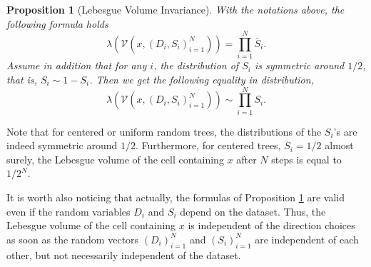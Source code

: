 \documentclass[paper=a4, fontsize=11pt]{scrartcl}
\newcommand{\ind}{\mathds{1}}
\newtheorem{proposition}[theorem]{Proposition}
\begin{document}
\begin{proposition}[Lebesgue Volume Invariance] \label{prop_leb_vol_inv}
With the notations above, the following formula holds
\begin{equation*} \label{eq_vol}
    \lambda(\mathcal V(x,(D_i,S_i)_{i=1}^N))=\prod_{i=1}^N \bar{S}_i.
\end{equation*}
Assume in addition that for any $i$, the distribution of $S_i$ is symmetric around $1/2$, that is, $S_i \sim 1-S_i$. Then we get the following equality in distribution,
    \begin{equation*}\label{eq_dist_inv}
        \lambda (\mathcal V(x,(D_i,S_i)_{i=1}^N)) \sim  \prod_{i=1}^N S_i.
    \end{equation*}
\end{proposition}


Note that for centered or uniform random trees, the distributions of the $S_i$'s are indeed symmetric around $1/2$. Furthermore, for centered trees, $S_i=1/2$ almost surely, the Lebesgue volume of the cell containing $x$ after $N$ steps is equal to $1/2^N$. 

It is worth also noticing that actually, the formulas of Proposition \ref{prop_leb_vol_inv} are valid even if the random variables $D_i$ and $S_i$ depend on the dataset. Thus, the Lebesgue volume of the cell containing $x$ is independent of the direction choices as soon as the random vectors $(D_i)_{i=1}^N$ and $(S_i)_{i=1}^N$ are independent of each other, but not necessarily independent of the dataset. 

\end{document}
